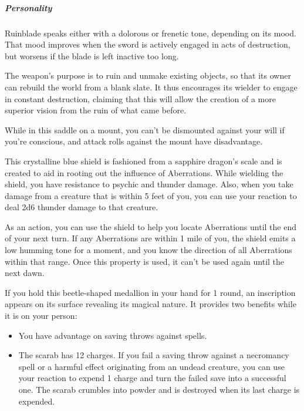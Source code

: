 \documentclass[10pt,a4paper,twoside,bg=print,twocolumn,openany,nodeprecatedcode]{dndbook}
\begin{document}
\subparagraph{Personality}
Ruinblade speaks either with a dolorous or frenetic tone, depending on its mood. That mood improves when the sword is actively engaged in acts of destruction, but worsens if the blade is left inactive too long.

The weapon's purpose is to ruin and unmake existing objects, so that its owner can rebuild the world from a blank slate. It thus encourages its wielder to engage in constant destruction, claiming that this will allow the creation of a more superior vision from the ruin of what came before.

While in this saddle on a mount, you can't be dismounted against your will if you're conscious, and attack rolls against the mount have disadvantage.

This crystalline blue shield is fashioned from a sapphire dragon's scale and is created to aid in rooting out the influence of Aberrations. While wielding the shield, you have resistance to psychic and thunder damage. Also, when you take damage from a creature that is within 5 feet of you, you can use your reaction to deal 2d6 thunder damage to that creature.

As an action, you can use the shield to help you locate Aberrations until the end of your next turn. If any Aberrations are within 1 mile of you, the shield emits a low humming tone for a moment, and you know the direction of all Aberrations within that range. Once this property is used, it can't be used again until the next dawn.

If you hold this beetle-shaped medallion in your hand for 1 round, an inscription appears on its surface revealing its magical nature. It provides two benefits while it is on your person:


\begin{itemize}
\item You have advantage on saving throws against spells.
\item The scarab has 12 charges. If you fail a saving throw against a necromancy spell or a harmful effect originating from an undead creature, you can use your reaction to expend 1 charge and turn the failed save into a successful one. The scarab crumbles into powder and is destroyed when its last charge is expended.
\end{itemize}
\end{document}
